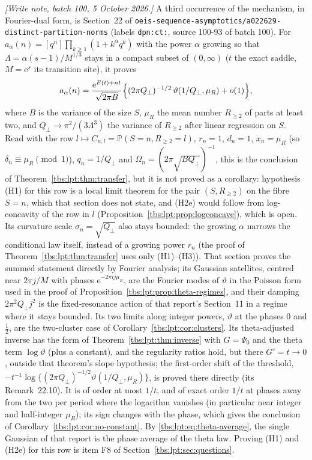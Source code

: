 \documentclass[11pt,a4paper]{article}
\numberwithin{equation}{section}
\theoremstyle{definition}
\newcommand{\ee}{\mathrm e}
\newcommand{\code}[1]{\texttt{#1}}
\begin{document}
\emph{[Write note, batch 100, 5 October 2026.]} A third occurrence of the
mechanism, in Fourier-dual form, is Section~22 of
\nolinkurl{oeis-sequence-asymptotics/a022629-distinct-partition-norms}
(labels \code{dpn:ct:}, source 100-93 of batch 100). For
$a_\alpha(n)=[q^n]\prod_{k\ge1}(1+k^\alpha q^k)$ with the power $\alpha$
growing so that $\Lambda=\alpha(s-1)/M^{1/3}$ stays in a compact subset of
$(0,\infty)$ ($t$ the exact saddle, $M=\ee^s$ its transition site), it proves
\[
 a_\alpha(n)=\frac{\ee^{F(t)+nt}}{\sqrt{2\pi B}}
 \Bigl\{(2\pi Q_\perp)^{-1/2}\,\vartheta(1/Q_\perp,\mu_R)+o(1)\Bigr\},
\]
where $B$ is the variance of the size $S$, $\mu_R$ the mean number
$R_{\ge2}$ of parts at least two, and $Q_\perp\to\pi^2/(3\Lambda^3)$ the
variance of $R_{\ge2}$ after linear regression on $S$. Read with the row
$l\mapsto C_{n,l}=\mathbb P(S=n,R_{\ge2}=l)$, $r_n=1$, $d_n=1$, $x_n=\mu_R$
(so $\delta_n\equiv\mu_R\pmod1$), $q_n=1/Q_\perp$ and
$\Omega_n=(2\pi\sqrt{BQ_\perp})^{-1}$, this is the conclusion of
Theorem~\ref{tbs:lpt:thm:transfer}, but it is not proved as a corollary:
hypothesis (H1) for this row is a local limit theorem for the pair
$(S,R_{\ge2})$ on the fibre $S=n$, which that section does not state, and
(H2e) would follow from log-concavity of the row in $l$
(Proposition~\ref{tbs:lpt:prop:logconcave}), which is open. Its curvature
scale $\sigma_n=\sqrt{Q_\perp}$ also stays bounded: the growing $\alpha$
narrows the conditional law itself, instead of a growing power $r_n$ (the
proof of Theorem~\ref{tbs:lpt:thm:transfer} uses only (H1)--(H3)). That
section proves the summed statement directly by Fourier analysis; its
Gaussian satellites, centred near $2\pi j/M$ with phases
$\ee^{-2\pi i j\mu_R}$, are the Fourier modes of $\vartheta$ in the Poisson
form used in the proof of Proposition~\ref{tbs:lpt:prop:theta-regimes}, and
their damping $2\pi^2Q_\perp j^2$ is the fixed-resonance action of that
report's Section~11 in a regime where it stays bounded. Its two limits along
integer powers, $\vartheta$ at the phases $0$ and $\frac12$, are the
two-cluster case of Corollary~\ref{tbs:lpt:cor:clusters}. Its
theta-adjusted inverse has the form of Theorem~\ref{tbs:lpt:thm:inverse}
with $G=\Psi_0$ and the theta term $\log\vartheta$ (plus a constant), and the
regularity ratios hold, but there $G'=t\to0$, outside that theorem's slope
hypothesis; the first-order shift of the threshold,
$-t^{-1}\log\{(2\pi Q_\perp)^{-1/2}\vartheta(1/Q_\perp,\mu_R)\}$, is proved
there directly (its Remark~22.10). It is of order at most $1/t$, and of exact
order $1/t$ at phases away from the two per period where the logarithm
vanishes (in particular near integer and half-integer $\mu_R$); its sign
changes with the phase, which gives the conclusion of
Corollary~\ref{tbs:lpt:cor:no-constant}. By
\eqref{tbs:lpt:eq:theta-average}, the single Gaussian of that report is the
phase average of the theta law. Proving (H1) and (H2e) for this row is
item F8 of Section~\ref{tbs:lpt:sec:questions}.
\end{document}
